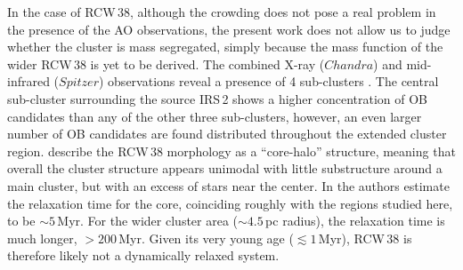 \documentclass[a4paper,fleqn,usenatbib]{mnras}
\begin{document}
In the case of RCW\,38, although the crowding does not pose a real problem in the presence of the AO observations, the present work does not allow us
to judge whether the cluster is mass segregated, simply because
the mass function of the wider RCW\,38 is yet to be derived.
The combined X-ray ($Chandra$) and mid-infrared ($Spitzer$) observations reveal a presence of 4 sub-clusters \citep{winston11}. 
The central sub-cluster surrounding the source IRS\,2 shows a higher concentration of OB candidates than any of the other
three sub-clusters, however, an even larger number of OB candidates are found distributed throughout the extended cluster region. 
\citet{kuhn14} describe the RCW\,38 morphology as a ``core-halo'' structure, meaning that overall the cluster structure
appears unimodal with little substructure around a main cluster, but with an excess of stars near the center. In 
\citet{kuhn15b} the authors estimate the relaxation time for the core, coinciding roughly with the regions studied here, to be $\sim 5\,$Myr. 
For the wider cluster area ($\sim 4.5\,$pc radius), the relaxation time is much longer, $>200\,$Myr. Given its very young age ($\lesssim1\,$Myr), RCW\,38 is therefore likely 
not a dynamically relaxed system.
\end{document}
